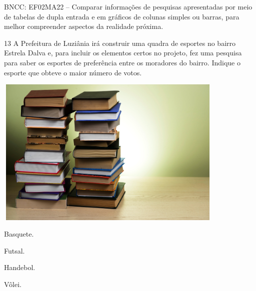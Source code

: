 \begin{escolha}
\begin{escolha}
{BNCC: EF02MA22 -- Comparar informações de pesquisas apresentadas por meio
de tabelas de dupla entrada e em gráficos de colunas simples ou barras,
para melhor compreender aspectos da realidade próxima.}

\num{13} A Prefeitura de Luziânia irá construir uma quadra de esportes no bairro
Estrela Dalva e, para incluir os elementos certos no projeto, fez uma
pesquisa para saber os esportes de preferência entre os moradores
do bairro. Indique o esporte que obteve o maior número de votos.

\includegraphics[width=4.32292in,height=2.82791in]{media/image123.png}


\begin{minipage}{.5\textwidth}
\begin{escolha}
\item Basquete.

\item Futsal.

\item Handebol.

\item Vôlei.
\end{escolha}
\end{minipage}


\end{escolha}
\end{escolha}
